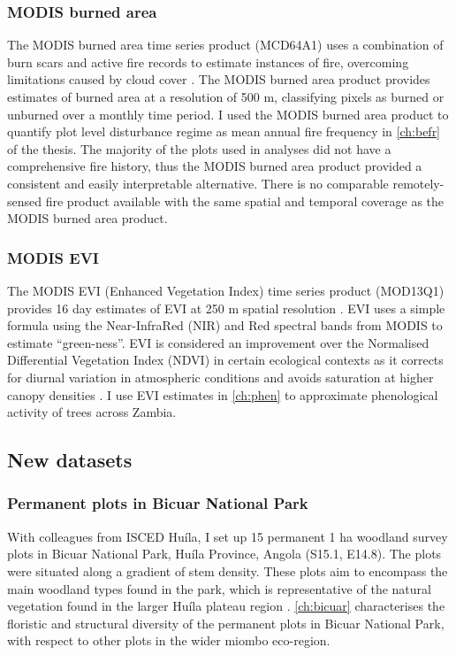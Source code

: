 \begin{refsection}
\subsubsection{MODIS burned area}
\label{intro:sssec:fire}

The MODIS burned area time series product (MCD64A1) uses a combination of burn scars and active fire records to estimate instances of fire, overcoming limitations caused by cloud cover \citep{MCD64A1}. The MODIS burned area product provides estimates of burned area at a resolution of 500 m, classifying pixels as burned or unburned over a monthly time period. I used the MODIS burned area product to quantify plot level disturbance regime as mean annual fire frequency in \autoref{ch:befr} of the thesis. The majority of the plots used in analyses did not have a comprehensive fire history, thus the MODIS burned area product provided a consistent and easily interpretable alternative. There is no comparable remotely-sensed fire product available with the same spatial and temporal coverage as the MODIS burned area product.

\subsubsection{MODIS EVI}
\label{intro:sssec:evi}

The MODIS EVI (Enhanced Vegetation Index) time series product (MOD13Q1) provides 16 day estimates of EVI at 250 m spatial resolution \citep{MOD13Q1}. EVI uses a simple formula using the Near-InfraRed (NIR) and Red spectral bands from MODIS to estimate ``green-ness''. EVI is considered an improvement over the Normalised Differential Vegetation Index (NDVI) in certain ecological contexts as it corrects for diurnal variation in atmospheric conditions and avoids saturation at higher canopy densities \citep{Huete2002}. I use EVI estimates in \autoref{ch:phen} to approximate phenological activity of trees across Zambia.

\subsection{New datasets}
\label{intro:ssec:new_data}

\subsubsection{Permanent plots in Bicuar National Park}
\label{intro:sssec:bicuar}

With colleagues from ISCED Hu\'{i}la, I set up 15 permanent 1 ha woodland survey plots in Bicuar National Park, Hu\'{i}la Province, Angola (S15.1\textdegree{}, E14.8\textdegree{}). The plots were situated along a gradient of stem density. These plots aim to encompass the main woodland types found in the park, which is representative of the natural vegetation found in the larger Hu\'{i}la plateau region \citep{Huntley2019}. \autoref{ch:bicuar} characterises the floristic and structural diversity of the permanent plots in Bicuar National Park, with respect to other plots in the wider miombo eco-region.


\end{refsection}
